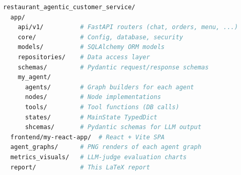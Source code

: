\documentclass[12pt,a4paper]{report}
\begin{document}
\begin{lstlisting}[language=bash, caption={Repository Layout}]
restaurant_agentic_customer_service/
  app/
    api/v1/          # FastAPI routers (chat, orders, menu, ...)
    core/            # Config, database, security
    models/          # SQLAlchemy ORM models
    repositories/    # Data access layer
    schemas/         # Pydantic request/response schemas
    my_agent/
      agents/        # Graph builders for each agent
      nodes/         # Node implementations
      tools/         # Tool functions (DB calls)
      states/        # MainState TypedDict
      shcemas/       # Pydantic schemas for LLM output
  frontend/my-react-app/  # React + Vite SPA
  agent_graphs/      # PNG renders of each agent graph
  metrics_visuals/   # LLM-judge evaluation charts
  report/            # This LaTeX report
\end{lstlisting}

\end{document}
